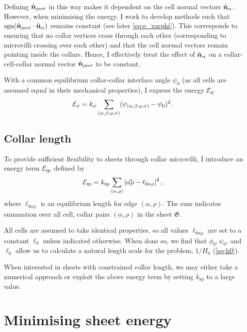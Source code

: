 Defining $\hat{\bm{n}}_{\rho\alpha\sigma}$ in this way makes it dependent on the cell normal vectors $\hat{\bm{n}}_\alpha$. 
However, when minimising the energy, I work to develop methods such that $\operatorname{sgn} (\hat{\bm{n}}_{\rho\alpha\sigma} \cdot \hat{\bm{n}}_\alpha)$ remains constant (see later \cref{eq:e_varphi}). 
This corresponds to ensuring that no collar vertices cross through each other (corresponding to microvilli crossing over each other) and that the cell normal vectors remain pointing inside the collars.
Hence, I effectively treat the effect of $\hat{\bm{n}}_\alpha$ on a collar-cell-collar normal vector $\hat{\bm{n}}_{\rho\alpha\sigma}$ to be constant.

With a common equilibrium collar-collar interface angle $\psi_0$ (as all cells are assumed equal in their mechanical properties), I express the energy $\mathcal{E}_\psi$ 
\begin{align}
	\mathcal{E}_\psi &= k_\psi \sum_{(\alpha, \beta: \rho, \sigma)} (\psi_{(\alpha, \beta: \rho, \sigma)} - \psi_0)^2. \label{eq:e_psi}
\end{align}

\subsection{Collar length}

To provide sufficient flexibility to sheets through collar microvilli, I introduce an energy term $\mathcal{E}_{\text{sp}}$ defined by 
\begin{align}
	\mathcal{E}_{\text{sp}} &= k_{\text{sp}} \sum_{(\alpha, \rho)} \left| \vec{\alpha\rho} - \ell_{0\alpha\rho} \right|^2, \label{eq:e_sp}
\end{align}
\noindent where $\ell_{0\alpha\rho}$ is an equilibrium length for edge $(\alpha, \rho)$. The sum indicates summation over all cell, collar pairs $(\alpha, \rho)$ in the sheet $\mathfrak{G}$.

All cells are assumed to take identical properties, so all values $\ell_{0\alpha\rho}$ are set to a constant $\ell_0$ unless indicated otherwise. 
When done so, we find that $\phi_0, \psi_0$, and $\ell_0$ allow us to calculate a natural length scale for the problem, $1/H_0$ (\cref{eq:h0}).

When interested in sheets with constrained collar length, we may either take a numerical approach or exploit the above energy term by setting $k_{\text{sp}}$ to a large value. 

\section{Minimising sheet energy}

